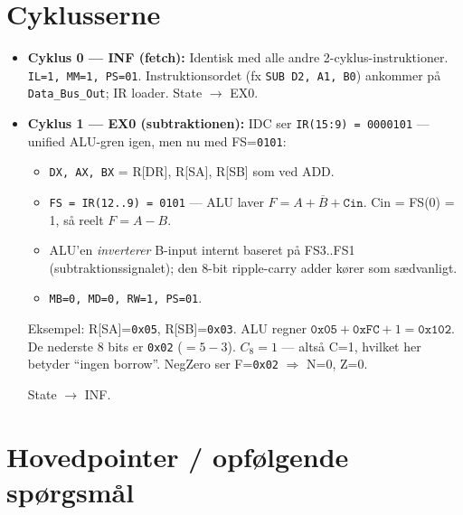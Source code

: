 \documentclass[11pt,a4paper]{article}
\begin{document}
\section*{Cyklusserne}

\begin{itemize}
  \item \textbf{Cyklus 0 --- \textsc{INF} (fetch):}
        Identisk med alle andre 2-cyklus-instruktioner. \texttt{IL=1, MM=1, PS=01}.
        Instruktionsordet (fx \texttt{SUB D2, A1, B0}) ankommer på \texttt{Data\_Bus\_Out};
        IR loader. State $\rightarrow$ \textsc{EX0}.

  \item \textbf{Cyklus 1 --- \textsc{EX0} (subtraktionen):}
        IDC ser \texttt{IR(15:9) = 0000101} --- unified ALU-gren igen, men nu med FS=\texttt{0101}:

        \begin{itemize}
          \item \texttt{DX, AX, BX} = R[DR], R[SA], R[SB] som ved ADD.
          \item \texttt{FS = IR(12..9) = 0101} --- ALU laver $F = A + \overline{B} + \texttt{Cin}$.
                Cin = FS(0) = 1, så reelt $F = A - B$.
          \item ALU'en \emph{inverterer} B-input internt baseret på FS3..FS1 (subtraktionssignalet);
                den 8-bit ripple-carry adder kører som sædvanligt.
          \item \texttt{MB=0, MD=0, RW=1, PS=01}.
        \end{itemize}

        Eksempel: R[SA]=\texttt{0x05}, R[SB]=\texttt{0x03}. ALU regner $\texttt{0x05} + \texttt{0xFC} + 1 = \texttt{0x102}$.
        De nederste 8 bits er \texttt{0x02} ($= 5-3$). $C_8 = 1$ --- altså C=1, hvilket her betyder
        ``ingen borrow''. NegZero ser F=\texttt{0x02} $\Rightarrow$ N=0, Z=0.

        State $\rightarrow$ \textsc{INF}.
\end{itemize}

\section*{Hovedpointer / opfølgende spørgsmål}
\end{document}
